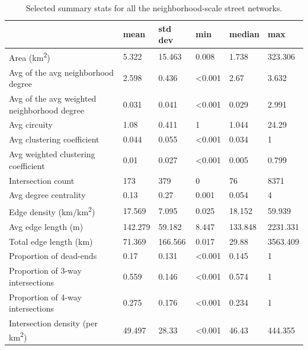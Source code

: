 \documentclass{article}
\begin{document}
\begin{table}
\centering
\caption{Selected summary stats for all the neighborhood-scale street networks.}
\label{table05}
\begin{tabular}{llllll}
	\toprule
	& mean    & std dev       & min            & median         & max      \\
	\midrule
	Area (km\textsuperscript{2})                                  & 5.322   & 15.463  & 0.008          & 1.738          & 323.306  \\
	Avg of the avg neighborhood degree          & 2.598   & 0.436   & \textless0.001 & 2.67           & 3.632    \\
	Avg of the avg weighted neighborhood degree & 0.031   & 0.041   & \textless0.001 & 0.029          & 2.991    \\
	Avg circuity                                & 1.08    & 0.411   & 1              & 1.044          & 24.29    \\
	Avg clustering coefficient                  & 0.044   & 0.055   & \textless0.001 & 0.034          & 1        \\
	Avg weighted clustering coefficient         & 0.01    & 0.027   & \textless0.001 & 0.005          & 0.799    \\
	Intersection count                          & 173     & 379     & 0              & 76             & 8371     \\
	Avg degree centrality                       & 0.13    & 0.27    & 0.001          & 0.054          & 4        \\
	Edge density (km/km\textsuperscript{2})                       & 17.569  & 7.095   & 0.025          & 18.152         & 59.939   \\
	Avg edge length (m)                         & 142.279 & 59.182  & 8.447          & 133.848        & 2231.331 \\
	Total edge length (km)                      & 71.369  & 166.566 & 0.017          & 29.88          & 3563.409 \\
	Proportion of dead-ends                     & 0.17    & 0.131   & \textless0.001 & 0.145          & 1        \\
	Proportion of 3-way intersections           & 0.559   & 0.146   & \textless0.001 & 0.574          & 1        \\
	Proportion of 4-way intersections           & 0.275   & 0.176   & \textless0.001 & 0.234          & 1        \\
	Intersection density (per km\textsuperscript{2})              & 49.497  & 28.33   & \textless0.001 & 46.43          & 444.355  \\

\end{tabular}
\end{table}
\end{document}
